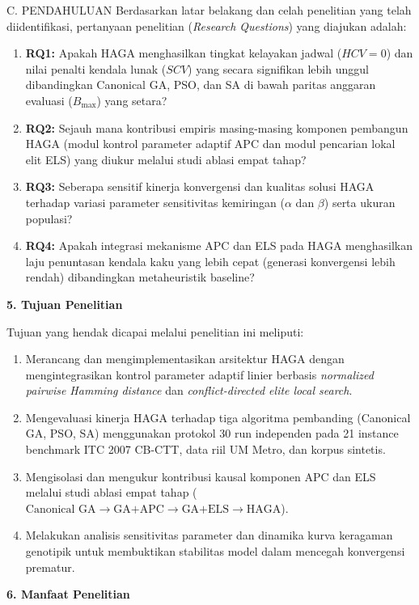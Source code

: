 \documentclass[letterpaper,12pt,oneside]{article}
\newcommand{\subheading}[2]{%
  \par\vspace{0.8em}\noindent
  \textbf{#1. #2}\par\vspace{0.3em}
}
\begin{document}
\begin{wordsection}{C. PENDAHULUAN}
Berdasarkan latar belakang dan celah penelitian yang telah diidentifikasi, pertanyaan penelitian (\textit{Research Questions}) yang diajukan adalah:
\begin{enumerate}
    \item \textbf{RQ1:} Apakah HAGA menghasilkan tingkat kelayakan jadwal ($HCV = 0$) dan nilai penalti kendala lunak ($SCV$) yang secara signifikan lebih unggul dibandingkan Canonical GA, PSO, dan SA di bawah paritas anggaran evaluasi ($B_{\max}$) yang setara?
    \item \textbf{RQ2:} Sejauh mana kontribusi empiris masing-masing komponen pembangun HAGA (modul kontrol parameter adaptif APC dan modul pencarian lokal elit ELS) yang diukur melalui studi ablasi empat tahap?
    \item \textbf{RQ3:} Seberapa sensitif kinerja konvergensi dan kualitas solusi HAGA terhadap variasi parameter sensitivitas kemiringan ($\alpha$ dan $\beta$) serta ukuran populasi?
    \item \textbf{RQ4:} Apakah integrasi mekanisme APC dan ELS pada HAGA menghasilkan laju penuntasan kendala kaku yang lebih cepat (generasi konvergensi lebih rendah) dibandingkan metaheuristik baseline?
\end{enumerate}

\subheading{5}{Tujuan Penelitian}

Tujuan yang hendak dicapai melalui penelitian ini meliputi:
\begin{enumerate}
    \item Merancang dan mengimplementasikan arsitektur HAGA dengan mengintegrasikan kontrol parameter adaptif linier berbasis \textit{normalized pairwise Hamming distance} dan \textit{conflict-directed elite local search}.
    \item Mengevaluasi kinerja HAGA terhadap tiga algoritma pembanding (Canonical GA, PSO, SA) menggunakan protokol 30 run independen pada 21 instance benchmark ITC 2007 CB-CTT, data riil UM Metro, dan korpus sintetis.
    \item Mengisolasi dan mengukur kontribusi kausal komponen APC dan ELS melalui studi ablasi empat tahap ($\text{Canonical GA} \to \text{GA+APC} \to \text{GA+ELS} \to \text{HAGA}$).
    \item Melakukan analisis sensitivitas parameter dan dinamika kurva keragaman genotipik untuk membuktikan stabilitas model dalam mencegah konvergensi prematur.
\end{enumerate}

\subheading{6}{Manfaat Penelitian}


\end{wordsection}
\end{document}

